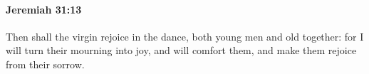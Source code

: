 
		\paragraph{Jeremiah 31:13} %
			\label{JEREMIAH-31-13}

			Then shall the virgin rejoice in the dance, both young men and old together: for I will turn their mourning into joy, and will comfort them, and make them rejoice from their sorrow.


